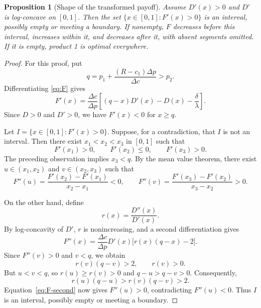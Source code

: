 \documentclass[11pt]{article}
\newtheorem{proposition}{Proposition}
\begin{document}
\begin{proposition}[Shape of the transformed payoff]\label{lem:F-shape}
Assume $D'(x)>0$ and $D'$ is log-concave on $[0,1]$. Then the set $\{x\in[0,1]:F'(x)>0\}$ is an interval, possibly empty or meeting a boundary. If nonempty, $F$ decreases before this interval, increases within it, and decreases after it, with absent segments omitted.
If it is empty, product 1 is optimal everywhere.
\end{proposition}
\begin{proof}
For this proof, put
\begin{equation*}
q=p_1+\frac{(R-c_1)\Delta p}{\Delta c}>p_2.
\end{equation*}
Differentiating \eqref{eq:F} gives
\begin{equation*}
F'(x)=\frac{\Delta c}{\Delta p}
\left[(q-x)D'(x)-D(x)-\frac\delta\lambda\right].
\end{equation*}
Since $D>0$ and $D'>0$, we have $F'(x)<0$ for $x\ge q$.

Let $I=\{x\in[0,1]:F'(x)>0\}$. Suppose, for a contradiction, that
$I$ is not an interval. Then there exist $x_1<x_2<x_3$ in $[0,1]$
such that
\begin{equation*}
F'(x_1)>0,\qquad F'(x_2)\le0,\qquad F'(x_3)>0.
\end{equation*}
The preceding observation implies $x_3<q$. By the mean value theorem,
there exist $u\in(x_1,x_2)$ and $v\in(x_2,x_3)$ such that
\begin{equation*}
F''(u)=\frac{F'(x_2)-F'(x_1)}{x_2-x_1}<0,
\qquad
F''(v)=\frac{F'(x_3)-F'(x_2)}{x_3-x_2}>0.
\end{equation*}

On the other hand, define
\begin{equation*}
r(x)=\frac{D''(x)}{D'(x)}.
\end{equation*}
By log-concavity of $D'$, $r$ is nonincreasing,
and a second differentiation gives
\begin{equation}\label{eq:F-second}
F''(x)=\frac{\Delta c}{\Delta p}D'(x)
       \bigl[r(x)(q-x)-2\bigr].
\end{equation}
Since $F''(v)>0$ and $v<q$, we obtain
\begin{equation*}
r(v)(q-v)>2,\qquad r(v)>0.
\end{equation*}
But $u<v<q$, so $r(u)\ge r(v)>0$ and $q-u>q-v>0$. Consequently,
\begin{equation*}
r(u)(q-u)>r(v)(q-v)>2.
\end{equation*}
Equation~\eqref{eq:F-second} now gives $F''(u)>0$, contradicting
$F''(u)<0$. Thus $I$ is an interval, possibly empty or meeting a boundary.


\end{proof}
\end{document}
